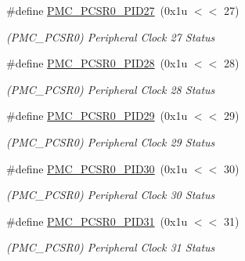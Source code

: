 \begin{DoxyCompactItemize}
\mbox{\label{group__SAME70__PMC_gaf258aa130d9c532be355c183873e67a2}} 
\#define \mbox{\hyperlink{group__SAME70__PMC_gaf258aa130d9c532be355c183873e67a2}{P\+M\+C\+\_\+\+P\+C\+S\+R0\+\_\+\+P\+I\+D27}}~(0x1u $<$$<$ 27)
\begin{DoxyCompactList}\small\item\em (P\+M\+C\+\_\+\+P\+C\+S\+R0) Peripheral Clock 27 Status \end{DoxyCompactList}\item 
\mbox{\label{group__SAME70__PMC_ga3f6889a313e24f63fb6c479534539535}} 
\#define \mbox{\hyperlink{group__SAME70__PMC_ga3f6889a313e24f63fb6c479534539535}{P\+M\+C\+\_\+\+P\+C\+S\+R0\+\_\+\+P\+I\+D28}}~(0x1u $<$$<$ 28)
\begin{DoxyCompactList}\small\item\em (P\+M\+C\+\_\+\+P\+C\+S\+R0) Peripheral Clock 28 Status \end{DoxyCompactList}\item 
\mbox{\label{group__SAME70__PMC_gabe1ff287c30c03e44cd9e76ae90bdf02}} 
\#define \mbox{\hyperlink{group__SAME70__PMC_gabe1ff287c30c03e44cd9e76ae90bdf02}{P\+M\+C\+\_\+\+P\+C\+S\+R0\+\_\+\+P\+I\+D29}}~(0x1u $<$$<$ 29)
\begin{DoxyCompactList}\small\item\em (P\+M\+C\+\_\+\+P\+C\+S\+R0) Peripheral Clock 29 Status \end{DoxyCompactList}\item 
\mbox{\label{group__SAME70__PMC_ga9fab50748c6e80609be228b4a39a7486}} 
\#define \mbox{\hyperlink{group__SAME70__PMC_ga9fab50748c6e80609be228b4a39a7486}{P\+M\+C\+\_\+\+P\+C\+S\+R0\+\_\+\+P\+I\+D30}}~(0x1u $<$$<$ 30)
\begin{DoxyCompactList}\small\item\em (P\+M\+C\+\_\+\+P\+C\+S\+R0) Peripheral Clock 30 Status \end{DoxyCompactList}\item 
\mbox{\label{group__SAME70__PMC_ga737a1566079f4040ca78725ec7a8c660}} 
\#define \mbox{\hyperlink{group__SAME70__PMC_ga737a1566079f4040ca78725ec7a8c660}{P\+M\+C\+\_\+\+P\+C\+S\+R0\+\_\+\+P\+I\+D31}}~(0x1u $<$$<$ 31)
\begin{DoxyCompactList}\small\item\em (P\+M\+C\+\_\+\+P\+C\+S\+R0) Peripheral Clock 31 Status \end{DoxyCompactList}\item 
$$
\end{DoxyCompactItemize}
